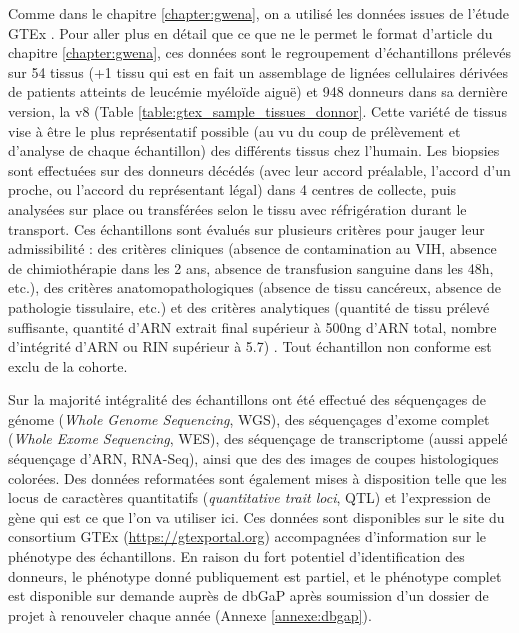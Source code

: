 Comme dans le chapitre \ref{chapter:gwena}, on a utilisé les données issues de l'étude GTEx \cite{Ardlie2015}. Pour aller plus en détail que ce que ne le permet le format d'article du chapitre \ref{chapter:gwena}, ces données sont le regroupement d'échantillons prélevés sur 54 tissus (+1 tissu qui est en fait un assemblage de lignées cellulaires dérivées de patients atteints de leucémie myéloïde aiguë\cite{Way2020}) et 948 donneurs dans sa dernière version, la v8 (Table \ref{table:gtex_sample_tissues_donnor}. Cette variété de tissus vise à être le plus représentatif possible (au vu du coup de prélèvement et d'analyse de chaque échantillon) des différents tissus chez l'humain. Les biopsies sont effectuées sur des donneurs décédés (avec leur accord préalable, l'accord d'un proche, ou l'accord du représentant légal) dans 4 centres de collecte, puis analysées sur place ou transférées selon le tissu avec réfrigération durant le transport. Ces échantillons sont évalués sur plusieurs critères pour jauger leur admissibilité : des critères cliniques (absence de contamination au VIH, absence de chimiothérapie dans les 2 ans, absence de transfusion sanguine dans les 48h, etc.), des critères anatomopathologiques (absence de tissu cancéreux, absence de pathologie tissulaire, etc.) et des critères analytiques (quantité de tissu prélevé suffisante, quantité d'ARN extrait final supérieur à 500ng d'ARN total, nombre d'intégrité d'ARN ou RIN supérieur à 5.7) \cite{Carithers2015}. Tout échantillon non conforme est exclu de la cohorte.

Sur la majorité intégralité des échantillons ont été effectué des séquençages de génome (\textit{Whole Genome Sequencing}, WGS), des séquençages d'exome complet (\textit{Whole Exome Sequencing}, WES), des séquençage de transcriptome (aussi appelé séquençage d'ARN, RNA-Seq), ainsi que des des images de coupes histologiques colorées. Des données reformatées sont également mises à disposition telle que les locus de caractères quantitatifs (\textit{quantitative trait loci}, QTL) et l'expression de gène qui est ce que l'on va utiliser ici. Ces données sont disponibles sur le site du consortium GTEx (\url{https://gtexportal.org}) accompagnées d'information sur le phénotype des échantillons. En raison du fort potentiel d'identification des donneurs, le phénotype donné publiquement est partiel, et le phénotype complet est disponible sur demande auprès de dbGaP après soumission d'un dossier de projet à renouveler chaque année (Annexe \ref{annexe:dbgap}).

